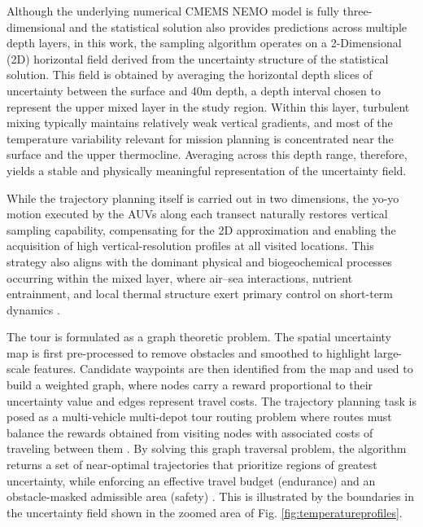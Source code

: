Although the underlying numerical CMEMS NEMO model is fully
three-dimensional and the statistical solution also provides
predictions across multiple depth layers, in this work, the sampling
algorithm operates on a 2-Dimensional (2D) horizontal field derived
from the uncertainty structure of the statistical solution. This field
is obtained by averaging the horizontal depth slices of uncertainty
between the surface and 40m depth, a depth interval chosen to
represent the upper mixed layer in the \naz study region. Within this
layer, turbulent mixing typically maintains relatively weak vertical
gradients, and most of the temperature variability relevant for
mission planning is concentrated near the surface and the upper
thermocline. Averaging across this depth range, therefore, yields a
stable and physically meaningful representation of the uncertainty
field.

While the trajectory planning itself is carried out in two dimensions,
the yo-yo motion executed by the AUVs along each transect naturally
restores vertical sampling capability, compensating for the 2D
approximation and enabling the acquisition of high vertical-resolution
profiles at all visited locations. This strategy also aligns with the
dominant physical and biogeochemical processes occurring within the
mixed layer, where air–sea interactions, nutrient entrainment, and
local thermal structure exert primary control on short-term dynamics
\parencite{mahadevan2016impact,behrenfeld2014resurrecting}.

The tour is formulated as a graph theoretic problem. The spatial
uncertainty map is first pre-processed to remove obstacles and
smoothed to highlight large-scale features. Candidate waypoints are
then identified from the map and used to build a weighted graph, where
nodes carry a reward proportional to their uncertainty value and edges
represent travel costs. The trajectory planning task is posed as a
multi-vehicle multi-depot tour routing problem where routes must
balance the rewards obtained from visiting nodes with associated costs
of traveling between them \parencite{vidal2013,toth2014vehicle}. By solving
this graph traversal problem, the algorithm returns a set of
near-optimal trajectories that prioritize regions of greatest
uncertainty, while enforcing an
  effective travel budget (endurance) and an obstacle-masked
  admissible area (safety) \parencite{bernacchi2025}. This is illustrated
  by the boundaries in the uncertainty field shown in the zoomed area
  of Fig. \ref{fig:temperatureprofiles}.



